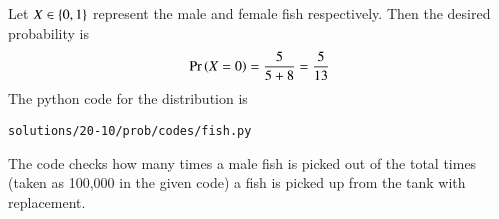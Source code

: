 Let $X \in \left\{0,1\right\}$ represent the male and female fish respectively.  Then
the desired probability is
\begin{align}
\Pr\left(X=0\right) = \frac{5}{5+8}=\frac{5}{13}
\end{align}
The python code for the distribution is
\begin{lstlisting}
solutions/20-10/prob/codes/fish.py
\end{lstlisting}
The code checks how many times a male fish is picked out of the total times (taken as 100,000 in the given code) a fish is picked up from the tank with replacement.

